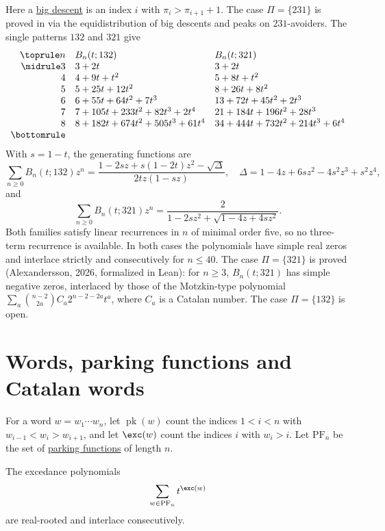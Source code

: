Here a \hyperref[bigDescent]{big descent} is an index $i$ with
$\pi_i\gt\pi_{i+1}+1$.  The case $\Pi=\{231\}$ is proved in
\cite{ElizaldeRiveraZhuang2026} via the equidistribution of big descents and
peaks on $231$-avoiders.  The single patterns $132$ and $321$ give
\[
\begin{array}{rll}
\toprule
n & B_n(t;132) & B_n(t;321) \\
\midrule
3 & 3+2t & 3+2t \\
4 & 4+9t+t^2 & 5+8t+t^2 \\
5 & 5+25t+12t^2 & 8+26t+8t^2 \\
6 & 6+55t+64t^2+7t^3 & 13+72t+45t^2+2t^3 \\
7 & 7+105t+233t^2+82t^3+2t^4 & 21+184t+196t^2+28t^3 \\
8 & 8+182t+674t^2+505t^3+61t^4 & 34+444t+732t^2+214t^3+6t^4 \\
\bottomrule
\end{array}
\]
With $s=1-t$, the generating functions are
\[
  \sum_{n\geq0}B_n(t;132)z^n
  =\frac{1-2sz+s(1-2t)z^2-\sqrt{\Delta}}{2tz(1-sz)},
  \quad
  \Delta=1-4z+6sz^2-4s^2z^3+s^2z^4,
\]
and
\[
  \sum_{n\geq0}B_n(t;321)z^n=\frac{2}{1-2sz^2+\sqrt{1-4z+4sz^2}}.
\]
Both families satisfy linear recurrences in $n$ of minimal order five, so no
three-term recurrence is available.  In both cases the polynomials have
simple real zeros and interlace strictly and consecutively for $n\leq40$.
The case $\Pi=\{321\}$ is proved (Alexandersson, 2026, formalized in Lean):
for $n\geq3$, $B_n(t;321)$ has simple negative zeros, interlaced by those of
the Motzkin-type polynomial
$\sum_{a}\binom{n-2}{2a}C_a2^{n-2-2a}t^a$, where $C_a$ is a Catalan number.
The case $\Pi=\{132\}$ is open.


\section[openProblemsWords]{Words, parking functions and Catalan words}

For a word $w=w_1\dotsm w_n$, let $\operatorname{pk}(w)$ count the indices
$1\lt i\lt n$ with $w_{i-1}\lt w_i\gt w_{i+1}$, and let $\exc(w)$ count
the indices $i$ with $w_i\gt i$.  Let $\mathrm{PF}_n$ be the set of
\hyperref[parkingFunctions]{parking functions} of length $n$.

\begin{conjecture}[Alexandersson, 2026]
\label{conjParkingExcedances}
The excedance polynomials
\[
  \sum_{w\in\mathrm{PF}_n}t^{\exc(w)}
\]
are real-rooted and interlace consecutively.
\end{conjecture}

